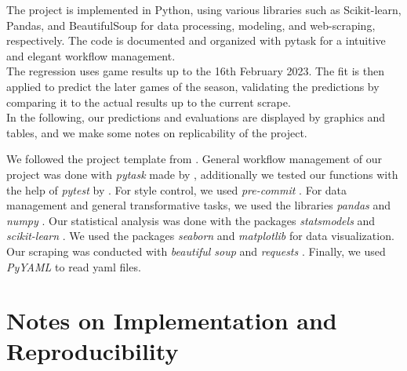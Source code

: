 \documentclass[11pt, a4paper, leqno]{article}
\begin{document}
The project is implemented in Python, using various libraries such as Scikit-learn, Pandas, and BeautifulSoup for data processing, modeling, and web-scraping, respectively.
The code is documented and organized with pytask for a intuitive and elegant workflow management.\\

The regression uses game results up to the 16th February 2023. The fit is then applied to predict the later games of the season, validating the predictions by comparing it to the actual results up to the current scrape.\\
In the following, our predictions and evaluations are displayed by graphics and tables, and we make some notes on replicability of the project.

We followed the project template from \citet{GaudeckerEconProjectTemplates}.
General workflow management of our project was done with \textit{pytask} made by \citet{Raabe2020}, additionally we tested our functions with the help of \textit{pytest} by \citet{pytest7.2.2}. For style control, we used \textit{pre-commit} \citep{pre-commit}.
For data management and general transformative tasks, we used the libraries \textit{pandas} \citep{mckinney2010data} and \textit{numpy} \citep{2020NumPy-Array}.
Our statistical analysis was done with the packages \textit{statsmodels} \citep{seabold2010statsmodels} and \textit{scikit-learn} \citep{scikit-learn}.
We used the packages \textit{seaborn} \citep{Waskom2021} and \textit{matplotlib} \citep{Hunter:2007} for data visualization.
Our scraping was conducted with \textit{beautiful soup} \citep{richardson2007beautiful} and \textit{requests} \citep{requests}.
Finally, we used \textit{PyYAML} \citep{PyYAML} to read yaml files.



\section{Notes on Implementation and Reproducibility}
\end{document}

